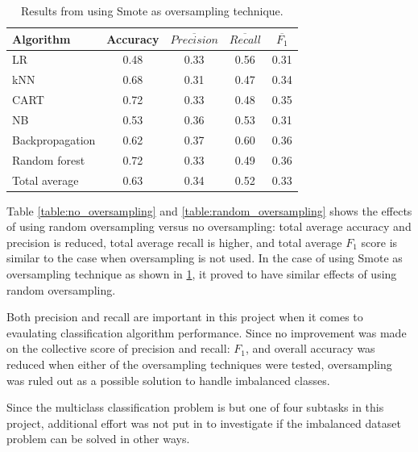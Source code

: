 	\begin{table}[H]
	\centering
	\caption{Results from using Smote as oversampling technique.}
		\begin{tabular}[5]{l | c | c | c | c}
    			Algorithm & Accuracy & $\overline{Precision}$ & $\overline{Recall}$ & $\overline{F_1}$ \\
    			\hline
			LR & 0.48 & 0.33 & 0.56 & 0.31 \\
			kNN & 0.68 &  0.31 & 0.47 &  0.34 \\
			CART & 0.72 & 0.33 & 0.48 &  0.35 \\
			NB &  0.53 & 0.36 & 0.53 & 0.31 \\
			Backpropagation & 0.62 & 0.37 & 0.60 & 0.36 \\
			Random forest & 0.72 & 0.33 & 0.49 &  0.36 \\
			\hline
			Total average & 0.63 & 0.34 & 0.52 & 0.33 
			\label{table:smote_oversampling}
		\end{tabular}
	\end{table}
	
	Table \ref{table:no_oversampling} and \ref{table:random_oversampling} shows the effects of using random oversampling versus no oversampling: total average accuracy and precision is reduced, total average recall is higher, and total average $F_1$ score is similar to the case when oversampling is not used. In the case of using Smote as oversampling technique as shown in \ref{table:smote_oversampling}, it proved to have similar effects of using random oversampling. 

	Both precision and recall are important in this project when it comes to evaulating classification algorithm performance. Since no improvement was made on the collective score of precision and recall: $F_1$, and overall accuracy was reduced when either of the oversampling techniques were tested, oversampling was ruled out as a possible solution to handle imbalanced classes. 

	Since the multiclass classification problem is but one of four subtasks in this project, additional effort was not put in to investigate if the imbalanced dataset problem can be solved in other ways.